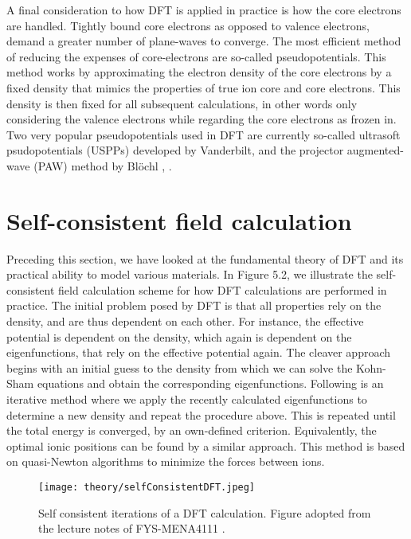 A final consideration to how DFT is applied in practice is how the core electrons are handled. Tightly bound core electrons as opposed to valence electrons, demand a greater number of plane-waves to converge. The most efficient method of reducing the expenses of core-electrons are so-called pseudopotentials. This method works by approximating the electron density of the core electrons by a fixed density that mimics the properties of true ion core and core electrons. This density is then fixed for all subsequent calculations, in other words only considering the valence electrons while regarding the core electrons as frozen in. Two very popular pseudopotentials used in DFT are currently so-called ultrasoft psudopotentials (USPPs) developed by Vanderbilt, and the projector augmented-wave (PAW) method by Bl\"{o}chl \cite{PAW1}, \cite{PAW2}.

\section{Self-consistent field calculation}

Preceding this section, we have looked at the fundamental theory of DFT and its practical ability to model various materials. In Figure 5.2, we illustrate the self-consistent field calculation scheme for how DFT calculations are performed in practice. The initial problem posed by DFT is that all properties rely on the density, and are thus dependent on each other. For instance, the effective potential is dependent on the density, which again is dependent on the eigenfunctions, that rely on the effective potential again. The cleaver approach begins with an initial guess to the density from which we can solve the Kohn-Sham equations and obtain the corresponding eigenfunctions. Following is an iterative method where we apply the recently calculated eigenfunctions to determine a new density and repeat the procedure above. This is repeated until the total energy is converged, by an own-defined criterion. Equivalently, the optimal ionic positions can be found by a similar approach. This method is based on quasi-Newton algorithms to minimize the forces between ions. 

\begin{figure}[H]
\centering
\texttt{[image: theory/selfConsistentDFT.jpeg]}
\caption{Self consistent iterations of a DFT calculation. Figure adopted from the lecture notes of FYS-MENA4111 \cite{persson2020}.}
\end{figure}


